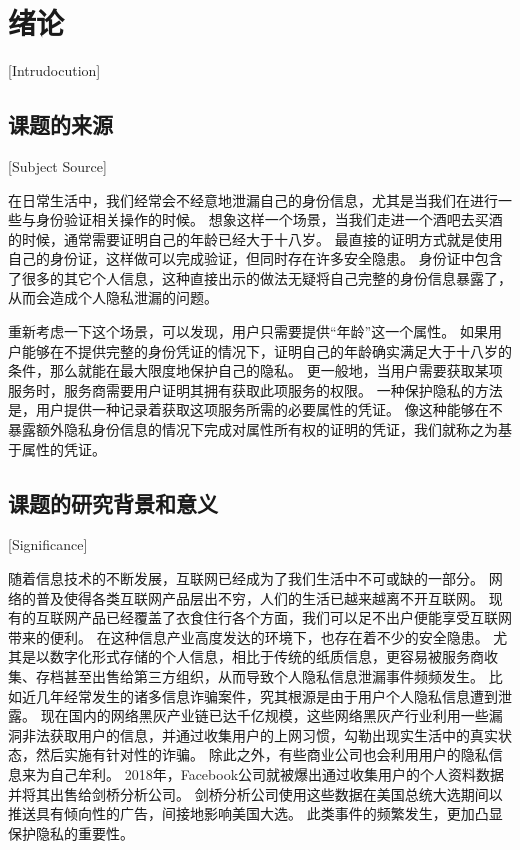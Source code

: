 

\chapter{绪论}[Intrudocution]

\section{课题的来源}[Subject Source]

在日常生活中，我们经常会不经意地泄漏自己的身份信息，尤其是当我们在进行一些与身份验证相关操作的时候。
想象这样一个场景，当我们走进一个酒吧去买酒的时候，通常需要证明自己的年龄已经大于十八岁。
最直接的证明方式就是使用自己的身份证，这样做可以完成验证，但同时存在许多安全隐患。
身份证中包含了很多的其它个人信息，这种直接出示的做法无疑将自己完整的身份信息暴露了，从而会造成个人隐私泄漏的问题。

重新考虑一下这个场景，可以发现，用户只需要提供“年龄”这一个属性。
如果用户能够在不提供完整的身份凭证的情况下，证明自己的年龄确实满足大于十八岁的条件，那么就能在最大限度地保护自己的隐私。
更一般地，当用户需要获取某项服务时，服务商需要用户证明其拥有获取此项服务的权限。
一种保护隐私的方法是，用户提供一种记录着获取这项服务所需的必要属性的凭证。
像这种能够在不暴露额外隐私身份信息的情况下完成对属性所有权的证明的凭证，我们就称之为基于属性的凭证。

\section{课题的研究背景和意义}[Significance]

随着信息技术的不断发展，互联网已经成为了我们生活中不可或缺的一部分。
网络的普及使得各类互联网产品层出不穷，人们的生活已越来越离不开互联网。
现有的互联网产品已经覆盖了衣食住行各个方面，我们可以足不出户便能享受互联网带来的便利。
在这种信息产业高度发达的环境下，也存在着不少的安全隐患。
尤其是以数字化形式存储的个人信息，相比于传统的纸质信息，更容易被服务商收集、存档甚至出售给第三方组织，从而导致个人隐私信息泄漏事件频频发生。
比如近几年经常发生的诸多信息诈骗案件，究其根源是由于用户个人隐私信息遭到泄露。
现在国内的网络黑灰产业链已达千亿规模，这些网络黑灰产行业利用一些漏洞非法获取用户的信息，并通过收集用户的上网习惯，勾勒出现实生活中的真实状态，然后实施有针对性的诈骗。
除此之外，有些商业公司也会利用用户的隐私信息来为自己牟利。
2018年，Facebook公司就被爆出通过收集用户的个人资料数据并将其出售给剑桥分析公司。
剑桥分析公司使用这些数据在美国总统大选期间以推送具有倾向性的广告，间接地影响美国大选\cite{fuller2019big}。
此类事件的频繁发生，更加凸显保护隐私的重要性。

